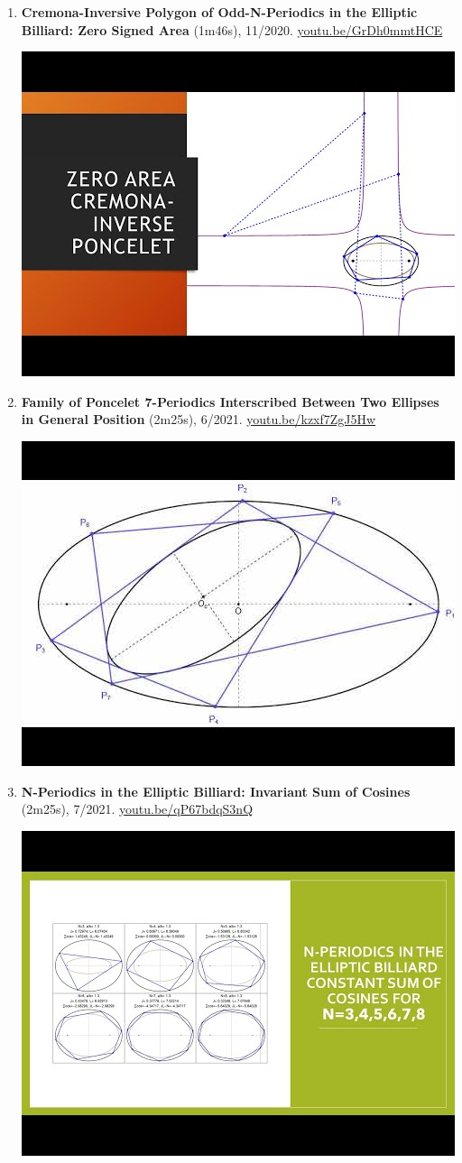 \documentclass[12pt]{article}
\begin{document}
\begin{enumerate}[resume]
% 
\item \textbf{Cremona-Inversive Polygon of Odd-N-Periodics in the Elliptic Billiard: Zero Signed Area} (1m46s), 11/2020. \href{https://youtu.be/GrDh0mmtHCE}{\url{youtu.be/GrDh0mmtHCE}}
\begin{center}\includegraphics[width=.5\textwidth]{pics/GrDh0mmtHCE.jpg}\end{center}
% 
\item \textbf{Family of Poncelet 7-Periodics Interscribed Between Two Ellipses in General Position} (2m25s), 6/2021. \href{https://youtu.be/kzxf7ZgJ5Hw}{\url{youtu.be/kzxf7ZgJ5Hw}}
\begin{center}\includegraphics[width=.5\textwidth]{pics/kzxf7ZgJ5Hw.jpg}\end{center}
% 
\item \textbf{N-Periodics in the Elliptic Billiard: Invariant Sum of Cosines} (2m25s), 7/2021. \href{https://youtu.be/qP67bdqS3nQ}{\url{youtu.be/qP67bdqS3nQ}}
\begin{center}\includegraphics[width=.5\textwidth]{pics/qP67bdqS3nQ.jpg}\end{center}

\end{enumerate}
\end{document}
